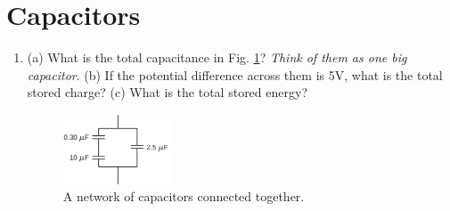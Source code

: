 \documentclass[10pt]{article}
\begin{document}
\section{Capacitors}

\begin{enumerate}
\item (a) What is the total capacitance in Fig. \ref{fig:caps1}?  \textit{Think of them as one big capacitor}. (b) If the potential difference across them is 5V, what is the total stored charge? (c) What is the total stored energy? 
\begin{figure}[hb]
\centering
\includegraphics[width=0.3\textwidth]{caps1.png}
\caption{\label{fig:caps1} A network of capacitors connected together.}
\end{figure}
\end{enumerate}
\end{document}
